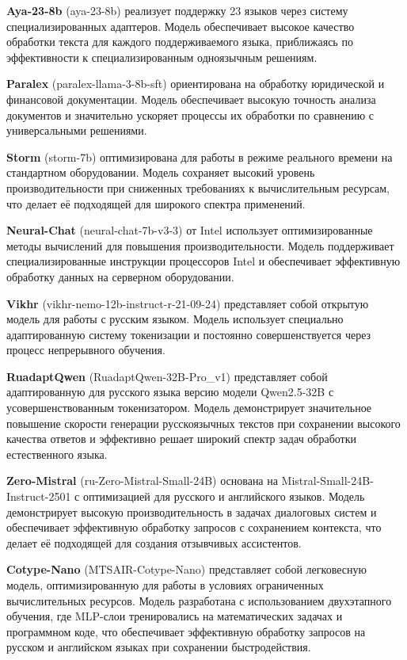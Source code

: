\textbf{Aya-23-8b} (aya-23-8b) реализует поддержку 23 языков через систему специализированных адаптеров. Модель обеспечивает высокое качество обработки текста для каждого поддерживаемого языка, приближаясь по эффективности к специализированным одноязычным решениям. \cite{aya}

\textbf{Paralex} (paralex-llama-3-8b-sft) ориентирована на обработку юридической и финансовой документации. Модель обеспечивает высокую точность анализа документов и значительно ускоряет процессы их обработки по сравнению с универсальными решениями. \cite{paralex}

\textbf{Storm} (storm-7b) оптимизирована для работы в режиме реального времени на стандартном оборудовании. Модель сохраняет высокий уровень производительности при сниженных требованиях к вычислительным ресурсам, что делает её подходящей для широкого спектра применений. \cite{storm}

\textbf{Neural-Chat} (neural-chat-7b-v3-3) от Intel использует оптимизированные методы вычислений для повышения производительности. Модель поддерживает специализированные инструкции процессоров Intel и обеспечивает эффективную обработку данных на серверном оборудовании. \cite{neural}

\textbf{Vikhr} (vikhr-nemo-12b-instruct-r-21-09-24) представляет собой открытую модель для работы с русским языком. Модель использует специально адаптированную систему токенизации и постоянно совершенствуется через процесс непрерывного обучения. \cite{vikhr}

\textbf{RuadaptQwen} (RuadaptQwen-32B-Pro\_v1) представляет собой адаптированную для русского языка версию модели Qwen2.5-32B с усовершенствованным токенизатором. Модель демонстрирует значительное повышение скорости генерации русскоязычных текстов при сохранении высокого качества ответов и эффективно решает широкий спектр задач обработки естественного языка. \cite{ruadapt}

\textbf{Zero-Mistral} (ru-Zero-Mistral-Small-24B) основана на Mistral-Small-24B-Instruct-2501 с оптимизацией для русского и английского языков. Модель демонстрирует высокую производительность в задачах диалоговых систем и обеспечивает эффективную обработку запросов с сохранением контекста, что делает её подходящей для создания отзывчивых ассистентов. \cite{zeromistral}

\textbf{Cotype-Nano} (MTSAIR-Cotype-Nano) представляет собой легковесную модель, оптимизированную для работы в условиях ограниченных вычислительных ресурсов. Модель разработана с использованием двухэтапного обучения, где MLP-слои тренировались на математических задачах и программном коде, что обеспечивает эффективную обработку запросов на русском и английском языках при сохранении быстродействия. \cite{cotype}

